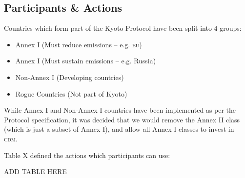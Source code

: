 \subsection{Participants \& Actions}
Countries which form part of the Kyoto Protocol have been split into 4 groups:

\begin{itemize}
	\item{Annex I (Must reduce emissions -- e.g. \textsc{eu})}
	\item{Annex I (Must sustain emissions -- e.g. Russia)}
	\item{Non-Annex I (Developing countries)}
	\item{Rogue Countries (Not part of Kyoto)}
\end{itemize}

While Annex I and Non-Annex I countries have been implemented as per the Protocol specification, it was decided that we would remove the Annex II class (which is just a subset of Annex I), and allow all Annex I classes to invest in \textsc{cdm}.

Table X defined the actions which participants can use:

\begin{center}
ADD TABLE HERE
\end{center}


